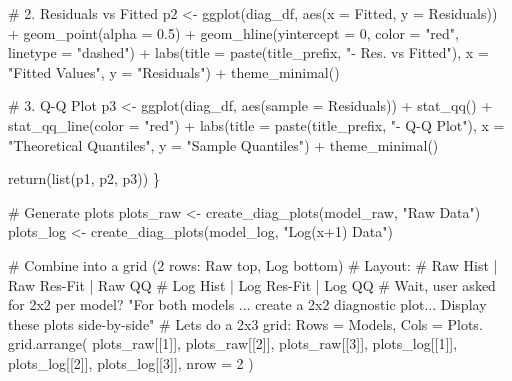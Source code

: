 \documentclass[
  letterpaper,
  DIV=11,
  numbers=noendperiod]{scrartcl}
\newenvironment{Shaded}{\begin{snugshade}}{\end{snugshade}}
\newcommand{\AttributeTok}[1]{\textcolor[rgb]{0.40,0.45,0.13}{#1}}
\newcommand{\CommentTok}[1]{\textcolor[rgb]{0.37,0.37,0.37}{#1}}
\newcommand{\DecValTok}[1]{\textcolor[rgb]{0.68,0.00,0.00}{#1}}
\newcommand{\FloatTok}[1]{\textcolor[rgb]{0.68,0.00,0.00}{#1}}
\newcommand{\FunctionTok}[1]{\textcolor[rgb]{0.28,0.35,0.67}{#1}}
\newcommand{\NormalTok}[1]{\textcolor[rgb]{0.00,0.23,0.31}{#1}}
\newcommand{\OtherTok}[1]{\textcolor[rgb]{0.00,0.23,0.31}{#1}}
\newcommand{\SpecialCharTok}[1]{\textcolor[rgb]{0.37,0.37,0.37}{#1}}
\newcommand{\StringTok}[1]{\textcolor[rgb]{0.13,0.47,0.30}{#1}}
\begin{document}
\begin{Shaded}
\begin{Highlighting}[]
  \CommentTok{\# 2. Residuals vs Fitted}
\NormalTok{  p2 }\OtherTok{\textless{}{-}} \FunctionTok{ggplot}\NormalTok{(diag\_df, }\FunctionTok{aes}\NormalTok{(}\AttributeTok{x =}\NormalTok{ Fitted, }\AttributeTok{y =}\NormalTok{ Residuals)) }\SpecialCharTok{+}
    \FunctionTok{geom\_point}\NormalTok{(}\AttributeTok{alpha =} \FloatTok{0.5}\NormalTok{) }\SpecialCharTok{+}
    \FunctionTok{geom\_hline}\NormalTok{(}\AttributeTok{yintercept =} \DecValTok{0}\NormalTok{, }\AttributeTok{color =} \StringTok{"red"}\NormalTok{, }\AttributeTok{linetype =} \StringTok{"dashed"}\NormalTok{) }\SpecialCharTok{+}
    \FunctionTok{labs}\NormalTok{(}\AttributeTok{title =} \FunctionTok{paste}\NormalTok{(title\_prefix, }\StringTok{"{-} Res. vs Fitted"}\NormalTok{), }\AttributeTok{x =} \StringTok{"Fitted Values"}\NormalTok{, }\AttributeTok{y =} \StringTok{"Residuals"}\NormalTok{) }\SpecialCharTok{+}
    \FunctionTok{theme\_minimal}\NormalTok{()}
  
  \CommentTok{\# 3. Q{-}Q Plot}
\NormalTok{  p3 }\OtherTok{\textless{}{-}} \FunctionTok{ggplot}\NormalTok{(diag\_df, }\FunctionTok{aes}\NormalTok{(}\AttributeTok{sample =}\NormalTok{ Residuals)) }\SpecialCharTok{+}
    \FunctionTok{stat\_qq}\NormalTok{() }\SpecialCharTok{+}
    \FunctionTok{stat\_qq\_line}\NormalTok{(}\AttributeTok{color =} \StringTok{"red"}\NormalTok{) }\SpecialCharTok{+}
    \FunctionTok{labs}\NormalTok{(}\AttributeTok{title =} \FunctionTok{paste}\NormalTok{(title\_prefix, }\StringTok{"{-} Q{-}Q Plot"}\NormalTok{), }\AttributeTok{x =} \StringTok{"Theoretical Quantiles"}\NormalTok{, }\AttributeTok{y =} \StringTok{"Sample Quantiles"}\NormalTok{) }\SpecialCharTok{+}
    \FunctionTok{theme\_minimal}\NormalTok{()}
    
  \FunctionTok{return}\NormalTok{(}\FunctionTok{list}\NormalTok{(p1, p2, p3))}
\NormalTok{\}}

\CommentTok{\# Generate plots}
\NormalTok{plots\_raw }\OtherTok{\textless{}{-}} \FunctionTok{create\_diag\_plots}\NormalTok{(model\_raw, }\StringTok{"Raw Data"}\NormalTok{)}
\NormalTok{plots\_log }\OtherTok{\textless{}{-}} \FunctionTok{create\_diag\_plots}\NormalTok{(model\_log, }\StringTok{"Log(x+1) Data"}\NormalTok{)}

\CommentTok{\# Combine into a grid (2 rows: Raw top, Log bottom)}
\CommentTok{\# Layout: }
\CommentTok{\# Raw Hist | Raw Res{-}Fit | Raw QQ}
\CommentTok{\# Log Hist | Log Res{-}Fit | Log QQ}
\CommentTok{\# Wait, user asked for 2x2 per model? "For both models ... create a 2x2 diagnostic plot... Display these plots side{-}by{-}side"}
\CommentTok{\# Let\textquotesingle{}s do a 2x3 grid: Rows = Models, Cols = Plots.}
\FunctionTok{grid.arrange}\NormalTok{(}
\NormalTok{  plots\_raw[[}\DecValTok{1}\NormalTok{]], plots\_raw[[}\DecValTok{2}\NormalTok{]], plots\_raw[[}\DecValTok{3}\NormalTok{]],}
\NormalTok{  plots\_log[[}\DecValTok{1}\NormalTok{]], plots\_log[[}\DecValTok{2}\NormalTok{]], plots\_log[[}\DecValTok{3}\NormalTok{]],}
  \AttributeTok{nrow =} \DecValTok{2}
\NormalTok{)}
\end{Highlighting}
\end{Shaded}
\end{document}
